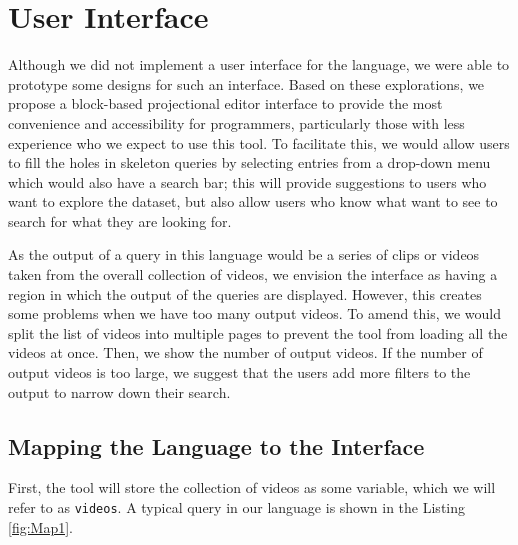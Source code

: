 
\section{User Interface}
Although we did not implement a user interface for the language, we were able to prototype some designs for such an interface. Based on these explorations, we propose a block-based projectional editor interface to provide the most convenience and accessibility for programmers, particularly those with less experience who we expect to use this tool. To facilitate this, we would allow users to fill the holes in skeleton queries by selecting entries from a drop-down menu which would also have a search bar; this will provide suggestions to users who want to explore the dataset, but also allow users who know what want to see to search for what they are looking for.  

As the output of a query in this language would be a series of clips or videos taken from the overall collection of videos,
we envision the interface as having a region in which the output of the queries are displayed.
However, this creates some problems when we have too many output videos.
To amend this, we would split the list of videos into multiple pages to prevent the tool from loading all the videos at once.
Then, we show the number of output videos.
If the number of output videos is too large, we suggest that the users add more filters to the output to narrow down their search.

\subsection{Mapping the Language to the Interface}

First, the tool will store the collection of videos as some variable,
which we will refer to as \texttt{videos}.
A typical query in our language is shown in the Listing \ref{fig:Map1}.

